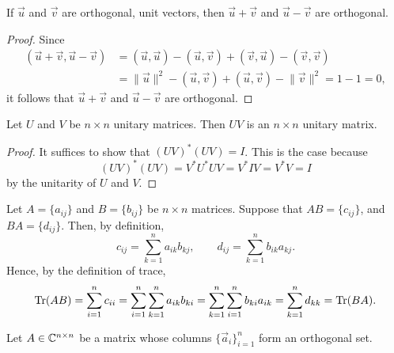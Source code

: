 \documentclass{homework}
\begin{document}
	\maketitle
	
	\question If $\vec{u}$ and $\vec{v}$ are orthogonal, unit vectors, then $\vec{u} + \vec{v}$ and $\vec{u} - \vec{v}$ are orthogonal.
	
	\begin{proof}
		Since
		\begin{align*}
			(\vec{u}+\vec{v}, \vec{u} - \vec{v}) &= (\vec{u},\vec{u}) - (\vec{u}, \vec{v}) + (\vec{v},\vec{u}) - (\vec{v},\vec{v})\\
			&= \lVert \vec{u}\rVert^2 - (\vec{u}, \vec{v}) + (\vec{u}, \vec{v}) - \lVert \vec{v}\rVert^2 = 1-1 =0,
		\end{align*}
		it follows that $\vec{u} + \vec{v}$ and $\vec{u} - \vec{v}$ are orthogonal.
	\end{proof}
	
	\question 
	
	\question Let $U$ and $V$ be $n\times n$ unitary matrices. Then $UV$ is an $n \times n$ unitary matrix.
	
	\begin{proof}
		It suffices to show that $(UV)^*(UV) = I$. This is the case because
		\begin{equation*}
			(UV)^*(UV) =V^*U^*UV = V^*IV = V^*V = I
		\end{equation*}
		by the unitarity of $U$ and $V$.
	\end{proof}
	
	\question Let $A = \{a_{ij}\}$ and $B = \{b_{ij}\}$ be $n \times n$ matrices. Suppose that $AB = \{c_{ij}\}$, and $BA = \{d_{ij}\}$. Then, by definition,
	\begin{equation*}
		c_{ij} = \sum_{k=1}^n a_{ik}b_{kj}, \qquad d_{ij} = \sum_{k=1}^n b_{ik}a_{kj}.
	\end{equation*} 
	Hence, by the definition of trace,
	\begin{equation*}
		\mathrm{Tr}(AB) = \sum_{i=1}^n c_{ii} = \sum_{i=1}^n\sum_{k=1}^n a_{ik}b_{ki}= \sum_{k=1}^n\sum_{i=1}^nb_{ki}a_{ik} = \sum_{k=1}^nd_{kk} = \mathrm{Tr}(BA).
	\end{equation*}
	
	\question Let $A \in \mathbb{C}^{n\times n}$ be a matrix whose columns $\{\vec{a}_i\}_{i=1}^n$ form an orthogonal set.
	
\end{document}
